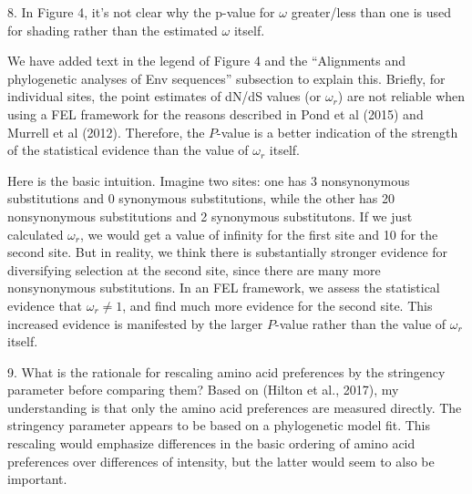 \documentclass[11pt, oneside]{article}   	%
\begin{document}
8. In Figure 4, it's not clear why the p-value for $\omega$ greater/less than one is used for shading rather than the estimated $\omega$ itself. 

{\color{black}
We have added text in the legend of Figure 4 and the ``Alignments and phylogenetic analyses of Env sequences'' subsection to explain this.
Briefly, for individual sites, the point estimates of dN/dS values (or $\omega_r$) are not reliable when using a FEL framework for the reasons described in Pond et al (2015) and Murrell et al (2012).
Therefore, the $P$-value is a better indication of the strength of the statistical evidence than the value of $\omega_r$ itself.

Here is the basic intuition. 
Imagine two sites: one has 3 nonsynonymous substitutions and 0 synonymous substitutions, while the other has 20 nonsynonymous substitutions and 2 synonymous substitutons.
If we just calculated $\omega_r$, we would get a value of infinity for the first site and 10 for the second site.
But in reality, we think there is substantially stronger evidence for diversifying selection at the second site, since there are many more nonsynonymous substitutions.
In an FEL framework, we assess the statistical evidence that $\omega_r \ne 1$, and find much more evidence for the second site.
This increased evidence is manifested by the larger $P$-value rather than the value of $\omega_r$ itself.}

9. What is the rationale for rescaling amino acid preferences by the stringency parameter before comparing them? Based on (Hilton et al., 2017), my understanding is that only the amino acid preferences are measured directly. The stringency parameter appears to be based on a phylogenetic model fit. This rescaling would emphasize differences in the basic ordering of amino acid preferences over differences of intensity, but the latter would seem to also be important. 
\end{document}
